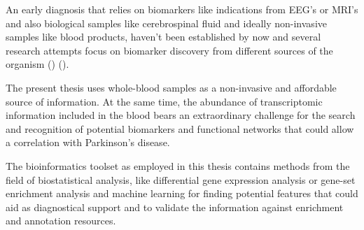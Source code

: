 \documentclass[12pt]{article}
\begin{document}
\begin{spacing}{1.5}
                    An early diagnosis that relies on biomarkers like indications from EEG's or MRI's and also biological samples like cerebrospinal fluid and ideally non-invasive samples like blood products, haven't been established by now and several research attempts focus on biomarker discovery from different sources of the organism (\emph{\cite{Miller2015BiomarkersFuture}}) (\emph{\cite{Maitin2022SurveyReview}}).
                \newpage
                \par
                    The present thesis uses whole-blood samples as a non-invasive and affordable source of information. At the same time, the abundance of transcriptomic information included in the blood bears an extraordinary challenge for the search and recognition of potential biomarkers and functional networks that could allow a correlation with Parkinson's disease.
                \par
                    The bioinformatics toolset as employed in this thesis contains methods from the field of biostatistical analysis, like differential gene expression analysis or gene-set enrichment analysis and machine learning for finding potential features that could aid as diagnostical support and to validate the information against enrichment and annotation resources.
            \end{spacing}
        \newpage
        \begin{spacing}{1.5}
            \printbibliography[title={Βιβλιογραφικές αναφορές}]
        \end{spacing}
\end{document}
